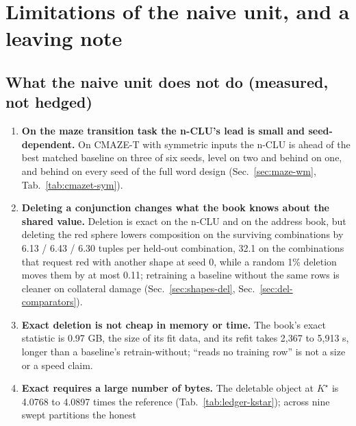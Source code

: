 \documentclass{article} %
\newcommand{\Kstar}{\ensuremath{K^{\star}}}
\begin{document}
\section{Limitations of the naive unit, and a leaving note}
\label{sec:limits}

\subsection{What the naive unit does not do (measured, not hedged)}
\label{sec:limits-list}

\begin{enumerate}[leftmargin=*,itemsep=1pt]
\item \textbf{On the maze transition task the n-CLU's lead is small and seed-dependent.}
  On CMAZE-T with symmetric inputs the n-CLU is ahead of the best matched baseline on three of six seeds,
  level on two and behind on one, and behind on every seed of the full word design %
  (Sec.~\ref{sec:maze-wm}, Tab.~\ref{tab:cmazet-sym}).
\item \textbf{Deleting a conjunction changes what the book knows about the shared value.} Deletion
  is exact on the n-CLU and on the address book, but deleting the red sphere lowers composition on
  the surviving combinations by 6.13 / 6.43 / 6.30 tuples per held-out combination, 32.1 on the combinations that request red %
  with another shape at seed 0, while a random 1\% deletion moves them by at most 0.11; retraining a %
  baseline without the same rows is cleaner on collateral damage (Sec.~\ref{sec:shapes-del},
  Sec.~\ref{sec:del-comparators}).
\item \textbf{Exact deletion is not cheap in memory or time.} The book's exact statistic is 0.97 GB, %
  the size of its fit data, and its refit takes 2,367 to 5,913 s, longer than a baseline's %
  retrain-without; ``reads no training row'' is not a size or a speed claim.
\item \textbf{Exact requires a large number of bytes.} The deletable object at $\Kstar$ is 4.0768 to 4.0897
  times the reference (Tab.~\ref{tab:ledger-kstar}); across nine swept partitions the honest

\end{enumerate}
\end{document}
